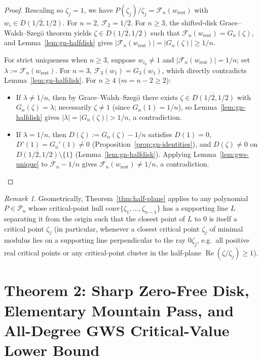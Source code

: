 \documentclass[11pt,a4paper]{article}
\theoremstyle{definition}
\theoremstyle{remark}
\newtheorem{remark}[theorem]{Remark}
\DeclareMathOperator{\RePart}{Re}
\begin{document}
\begin{proof}
Rescaling so $\zeta_j = 1$, we have $P(\zeta_j)/\zeta_j = \mathcal{F}_n(w_{\mathrm{rest}})$ with $w_i \in \overline{D(1/2, 1/2)}$.
For $n = 2$, $\mathcal{F}_2 = 1/2$. For $n \ge 3$, the shifted-disk Grace--Walsh--Szeg\"o theorem yields $\zeta \in \overline{D(1/2, 1/2)}$ such that $\mathcal{F}_n(w_{\mathrm{rest}}) = G_n(\zeta)$, and Lemma~\ref{lem:gn-halfdisk} gives $|\mathcal{F}_n(w_{\mathrm{rest}})| = |G_n(\zeta)| \ge 1/n$.

For strict uniqueness when $n \ge 3$, suppose $w_{i_0} \neq 1$ and $|\mathcal{F}_n(w_{\mathrm{rest}})| = 1/n$; set $\lambda := \mathcal{F}_n(w_{\mathrm{rest}})$. For $n = 3$, $\mathcal{F}_3(w_1) = G_3(w_1)$, which directly contradicts Lemma~\ref{lem:gn-halfdisk}. For $n \ge 4$ ($m = n - 2 \ge 2$):
\begin{itemize}
\item If $\lambda \neq 1/n$, then by Grace--Walsh--Szeg\"o there exists $\zeta \in \overline{D(1/2, 1/2)}$ with $G_n(\zeta) = \lambda$; necessarily $\zeta \neq 1$ (since $G_n(1) = 1/n$), so Lemma~\ref{lem:gn-halfdisk} gives $|\lambda| = |G_n(\zeta)| > 1/n$, a contradiction.
\item If $\lambda = 1/n$, then $D(\zeta) := G_n(\zeta) - 1/n$ satisfies $D(1) = 0$, $D'(1) = G_n'(1) \neq 0$ (Proposition~\ref{prop:gn-identities}), and $D(\zeta) \neq 0$ on $\overline{D(1/2, 1/2)} \setminus \{1\}$ (Lemma~\ref{lem:gn-halfdisk}). Applying Lemma~\ref{lem:gws-unique} to $\mathcal{F}_n - 1/n$ gives $\mathcal{F}_n(w_{\mathrm{rest}}) \neq 1/n$, a contradiction. \qedhere
\end{itemize}
\end{proof}

\begin{remark}
Geometrically, Theorem~\ref{thm:half-plane} applies to any polynomial $P \in \mathcal{P}_n$ whose critical-point hull $\mathrm{conv}\{\zeta_1, \dots, \zeta_{n-1}\}$ has a supporting line $L$ separating it from the origin such that the closest point of $L$ to $0$ is itself a critical point $\zeta_j$ (in particular, whenever a closest critical point $\zeta_j$ of minimal modulus lies on a supporting line perpendicular to the ray $0\zeta_j$, e.g.\ all positive real critical points or any critical-point cluster in the half-plane $\RePart(\zeta/\zeta_j) \ge 1$).
\end{remark}

\section{Theorem 2: Sharp Zero-Free Disk, Elementary Mountain Pass, and All-Degree GWS Critical-Value Lower Bound}
\end{document}
